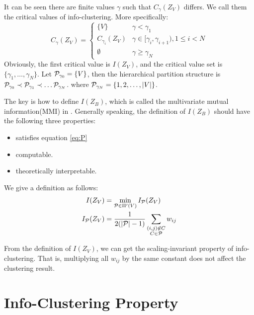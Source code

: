 \documentclass{article}
\begin{document}
It can be seen there are finite values $\gamma$ such that $C_{\gamma}(Z_V)$ differs.
We call them the critical values of info-clustering.
More specifically:
\begin{equation*}
C_{\gamma}(Z_V) = \begin{cases}
\{V\} & \gamma < \gamma_1 \\
C_{\gamma_i}(Z_V) & \gamma \in [\gamma_i, \gamma_{i+1}), 1\leq i < N \\
\emptyset & \gamma \geq \gamma_N
\end{cases}
\end{equation*}
Obviously, the first critical value is $I(Z_V)$, and the critical value set is $\{\gamma_1, \dots, \gamma_N \}$.
Let $\P_{\gamma_0} = \{V\}$, then the hierarchical partition structure is $\P_{\gamma_0} \prec \P_{\gamma_1} \prec \dots \P_{\gamma_N}$.
where $\P_{\gamma_N} = \{1, 2, \dots, \abs{V}\}$.

The key is how to define $I(Z_B)$, which is called the multivariate mutual information(MMI) in \cite{ic}. Generally speaking, the definition of $I(Z_B)$ should have the following three properties:
\begin{itemize}
\item satisfies equation \eqref{eq:P}
\item computable.
\item theoretically interpretable.
\end{itemize}

We give a definition as follows:
\begin{align}\label{eq:IZV}
I(Z_V) & = \min_{\mathcal{P} \in \Pi'(V)} I_{\mathcal{P}}(Z_V) \\
\label{eq:newDef}  I_{\mathcal{P}}(Z_V) & = \frac{1}{ 2( \abs{\mathcal{P}} - 1) } \sum_{\substack{(i,j) \not\in C\\ C\in \mathcal{P}}} w_{ij}
\end{align}

\begin{remark}
From the definition of $I(Z_V)$, we can get the scaling-invariant property of info-clustering. 
That is, multiplying all $ w_{ij}$ by the same constant does not affect the clustering result.
\end{remark}
\section{Info-Clustering Property}
\end{document}
